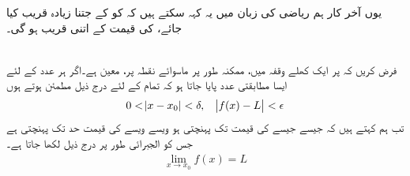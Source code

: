 یوں آخر کار ہم ریاضی کی زبان میں یہ کہہ سکتے ہیں کہ  کو  کے جتنا زیادہ قریب کیا جائے،  کی قیمت  کے اتنی قریب ہو گی۔

\\
فرض کریں کہ   پر ایک کھلے وقفہ میں،  ممکنہ طور پر ماسوائے نقطہ  پر،  معین ہے۔اگر ہر عدد  کے لئے ایسا مطابقتی عدد  پایا جاتا ہو کہ تمام  کے لئے درج ذیل مطمئن ہوتے ہوں  
\begin{align*}
0<\abs{x-x_0}<\delta,\quad \abs{f(x)-L}<\epsilon
\end{align*}
تب ہم کہتے ہیں کہ جیسے جیسے  کی قیمت  تک پہنچتی ہو ویسے ویسے  کی قیمت حد  تک پہنچتی ہے جس کو الجبرائی طور پر درج ذیل لکھا جاتا ہے۔
\begin{align*}
\lim_{x\to x_0} f(x)=L
\end{align*} 
